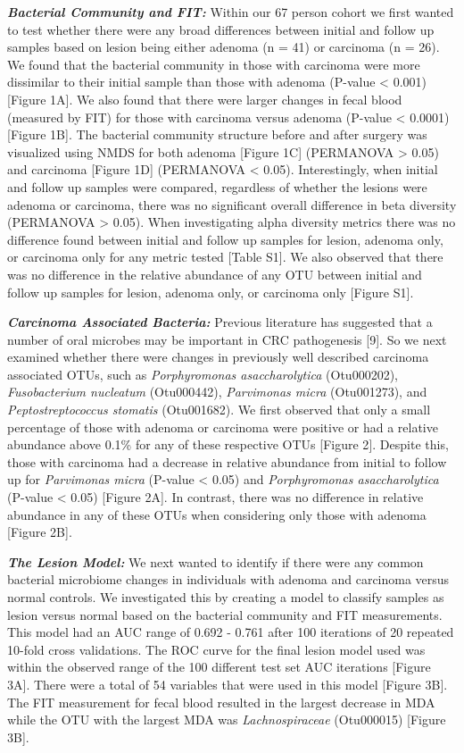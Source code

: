 \documentclass[12pt,]{article}
\begin{document}
\textbf{\emph{Bacterial Community and FIT:}} Within our 67 person cohort
we first wanted to test whether there were any broad differences between
initial and follow up samples based on lesion being either adenoma (n =
41) or carcinoma (n = 26). We found that the bacterial community in
those with carcinoma were more dissimilar to their initial sample than
those with adenoma (P-value \textless{} 0.001) {[}Figure 1A{]}. We also
found that there were larger changes in fecal blood (measured by FIT)
for those with carcinoma versus adenoma (P-value \textless{} 0.0001)
{[}Figure 1B{]}. The bacterial community structure before and after
surgery was visualized using NMDS for both adenoma {[}Figure 1C{]}
(PERMANOVA \textgreater{} 0.05) and carcinoma {[}Figure 1D{]} (PERMANOVA
\textless{} 0.05). Interestingly, when initial and follow up samples
were compared, regardless of whether the lesions were adenoma or
carcinoma, there was no significant overall difference in beta diversity
(PERMANOVA \textgreater{} 0.05). When investigating alpha diversity
metrics there was no difference found between initial and follow up
samples for lesion, adenoma only, or carcinoma only for any metric
tested {[}Table S1{]}. We also observed that there was no difference in
the relative abundance of any OTU between initial and follow up samples
for lesion, adenoma only, or carcinoma only {[}Figure S1{]}.

\textbf{\emph{Carcinoma Associated Bacteria:}} Previous literature has
suggested that a number of oral microbes may be important in CRC
pathogenesis {[}9{]}. So we next examined whether there were changes in
previously well described carcinoma associated OTUs, such as
\emph{Porphyromonas asaccharolytica} (Otu000202), \emph{Fusobacterium
nucleatum} (Otu000442), \emph{Parvimonas micra} (Otu001273), and
\emph{Peptostreptococcus stomatis} (Otu001682). We first observed that
only a small percentage of those with adenoma or carcinoma were positive
or had a relative abundance above 0.1\% for any of these respective OTUs
{[}Figure 2{]}. Despite this, those with carcinoma had a decrease in
relative abundance from initial to follow up for \emph{Parvimonas micra}
(P-value \textless{} 0.05) and \emph{Porphyromonas asaccharolytica}
(P-value \textless{} 0.05) {[}Figure 2A{]}. In contrast, there was no
difference in relative abundance in any of these OTUs when considering
only those with adenoma {[}Figure 2B{]}.

\textbf{\emph{The Lesion Model:}} We next wanted to identify if there
were any common bacterial microbiome changes in individuals with adenoma
and carcinoma versus normal controls. We investigated this by creating a
model to classify samples as lesion versus normal based on the bacterial
community and FIT measurements. This model had an AUC range of 0.692 -
0.761 after 100 iterations of 20 repeated 10-fold cross validations. The
ROC curve for the final lesion model used was within the observed range
of the 100 different test set AUC iterations {[}Figure 3A{]}. There were
a total of 54 variables that were used in this model {[}Figure 3B{]}.
The FIT measurement for fecal blood resulted in the largest decrease in
MDA while the OTU with the largest MDA was \emph{Lachnospiraceae}
(Otu000015) {[}Figure 3B{]}.
\end{document}
